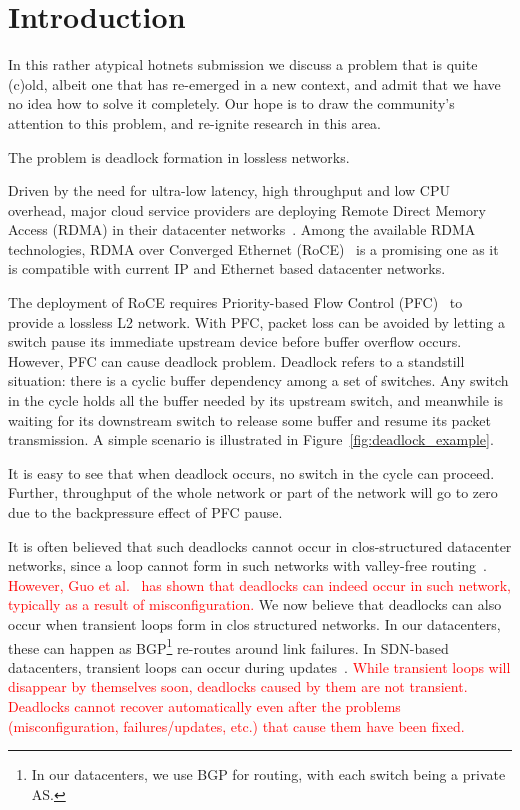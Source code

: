 \secspace
\section{Introduction}
\secspace
\label{sec:intro}

In this rather atypical hotnets submission we discuss a problem that is quite
(c)old, albeit one that has re-emerged in a new context, and admit that we have
no idea how to solve it completely. Our hope is to draw the community's
attention to this problem, and re-ignite research in this area.

The problem is deadlock formation in lossless networks.

Driven by the need for ultra-low latency, high throughput and low CPU overhead,
major cloud service providers are deploying Remote Direct Memory Access (RDMA) in
their datacenter networks~\cite{dcqcn,timely}. Among the
available RDMA technologies,  RDMA over Converged Ethernet (RoCE)~\cite{roce} is
a promising one as it is compatible with current IP and Ethernet based
datacenter networks.

The deployment of RoCE requires Priority-based Flow Control (PFC)~\cite{pfc} to
provide a lossless L2 network. With PFC, packet loss can be avoided by letting a
switch pause its immediate upstream device before buffer overflow occurs.
However, PFC can cause deadlock problem. Deadlock refers to a
standstill situation: there is a cyclic buffer dependency among a set of
switches. Any switch in the cycle holds all the buffer needed by its upstream
switch, and meanwhile is waiting for its downstream switch to release some
buffer and resume its packet transmission. A simple scenario is illustrated in
Figure~\ref{fig:deadlock_example}. 

It is easy to see that when deadlock occurs, no switch in the cycle can proceed. Further, throughput of the whole network
or part of the network will go to zero due to the backpressure
effect of PFC pause.



It is often believed that such deadlocks cannot occur in
clos-structured datacenter networks, since a loop cannot form in such networks
with valley-free routing~\cite{dcqcn}.  \textcolor{red}{However, Guo et al.~\cite{rdmascale} has shown that
deadlocks can indeed occur in such network, typically as a result of
misconfiguration.} We now believe that deadlocks can also occur when transient
loops form in clos structured networks. In our datacenters, these can happen as
BGP\footnote{In our datacenters, we use BGP for routing, with each switch being
a private AS.} re-routes around link failures. In SDN-based datacenters,
transient loops can occur during updates~\cite{dionysus}. \textcolor{red}{While transient loops will disappear by themselves soon, deadlocks caused by them are not transient. Deadlocks cannot recover automatically even after the problems (misconfiguration, failures/updates, etc.) that cause them have been fixed.}

